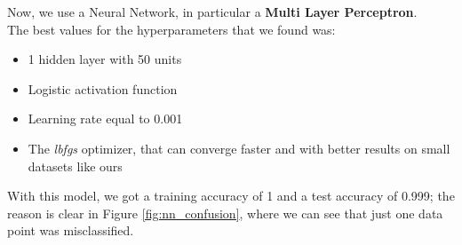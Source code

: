 Now, we use a Neural Network, in particular a \textbf{Multi Layer Perceptron}.\\
The best values for the hyperparameters that we found was:
\begin{itemize}
\item 1 hidden layer with 50 units
\item Logistic activation function
\item Learning rate equal to 0.001
\item The \emph{lbfgs} optimizer, that can converge faster and with better results on small datasets like ours
\end{itemize}

With this model, we got a training accuracy of 1 and a test accuracy of 0.999; the reason is clear in Figure \ref{fig:nn_confusion}, where we can see that just one data point was misclassified.

